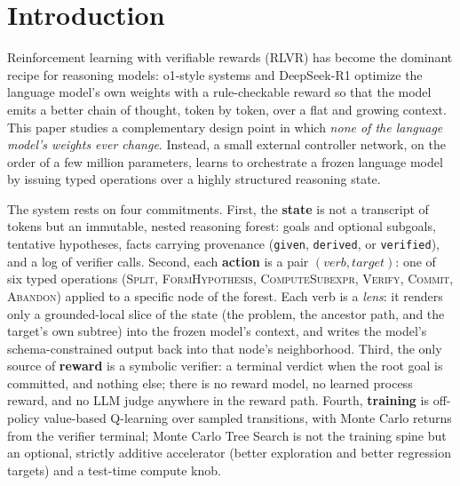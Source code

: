 \section{Introduction}
\label{sec:introduction}

Reinforcement learning with verifiable rewards (RLVR) has become the
dominant recipe for reasoning models: o1-style systems and DeepSeek-R1
\citep{deepseekr1} optimize the language model's own weights with a
rule-checkable reward so that the model emits a better chain of thought,
token by token, over a flat and growing context. This paper studies a
complementary design point in which \emph{none of the language model's
weights ever change}. Instead, a small external controller network, on the
order of a few million parameters, learns to orchestrate a frozen language
model by issuing typed operations over a highly structured reasoning state.

The system rests on four commitments. First, the \textbf{state} is not a
transcript of tokens but an immutable, nested reasoning forest: goals and
optional subgoals, tentative hypotheses, facts carrying provenance
(\texttt{given}, \texttt{derived}, or \texttt{verified}), and a log of
verifier calls. Second, each \textbf{action} is a pair
$(\textit{verb}, \textit{target})$: one of six typed operations
(\textsc{Split}, \textsc{FormHypothesis}, \textsc{ComputeSubexpr},
\textsc{Verify}, \textsc{Commit}, \textsc{Abandon}) applied to a specific
node of the forest. Each verb is a \emph{lens}: it renders only a
grounded-local slice of the state (the problem, the ancestor path, and the
target's own subtree) into the frozen model's context, and writes the
model's schema-constrained output back into that node's neighborhood. Third,
the only source of \textbf{reward} is a symbolic verifier: a terminal
verdict when the root goal is committed, and nothing else; there is no
reward model, no learned process reward, and no LLM judge anywhere in the
reward path. Fourth, \textbf{training} is off-policy value-based
Q-learning over sampled transitions, with Monte Carlo returns from the
verifier terminal; Monte Carlo Tree Search is not the training spine but an
optional, strictly additive accelerator (better exploration and better
regression targets) and a test-time compute knob.

